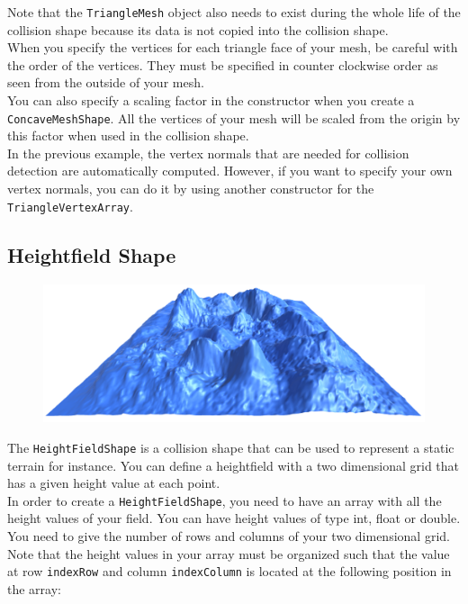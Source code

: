 \documentclass[a4paper,12pt]{article}
\begin{document}
  \vspace{0.6cm}

  Note that the \texttt{TriangleMesh} object also needs to exist during the whole life of the collision shape because its
  data is not copied into the collision shape. \\

  When you specify the vertices for each triangle face of your mesh, be careful with the order of the vertices. They must be specified in counter clockwise order
  as seen from the outside of your mesh. \\

  You can also specify a scaling factor in the constructor when you create a \texttt{ConcaveMeshShape}. All the vertices of your mesh will be scaled from the origin by this factor
  when used in the collision shape. \\

  In the previous example, the vertex normals that are needed for collision detection are automatically computed. However, if you want to specify your own
  vertex normals, you can do it by using another constructor for the \texttt{TriangleVertexArray}. \\

  \subsection{Heightfield Shape}

  \begin{figure}[h]
      \centering
      \includegraphics{heightfieldshape.png}
      \label{fig:heightfieldshape}
  \end{figure}

  The \texttt{HeightFieldShape} is a collision shape that can be used to represent a static terrain for instance. You can
  define a heightfield with a two dimensional grid that has a given height value at each point. \\

  In order to create a \texttt{HeightFieldShape}, you need to have an array with all the height values of your field.
  You can have height values of type int, float or double. You need to give the number of rows and columns of your two
  dimensional grid. Note that the height values in your array must be organized such that the value at row
  \texttt{indexRow} and column \texttt{indexColumn} is located at the following position in the array: \\
\end{document}
